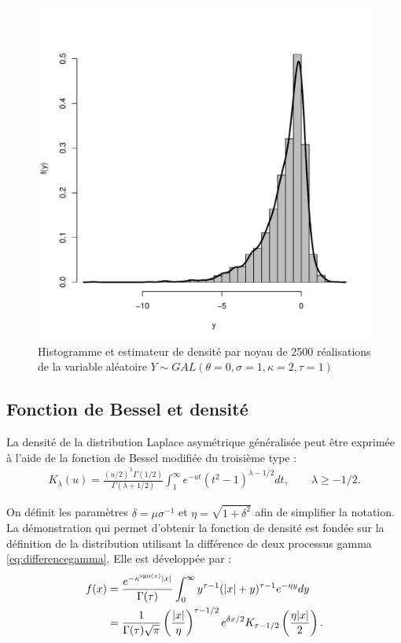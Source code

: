\begin{figure}[!ht]
  \centering
  \includegraphics[scale=0.8]{"../graphiques/CH3-SIMULGAL0121"}
  \caption{Histogramme et estimateur de densité par noyau de 2500
    réalisations de la variable aléatoire $Y\sim
    GAL(\theta=0,\sigma=1,\kappa=2,\tau=1)$}
  \label{fig:simulGAL}
\end{figure}

\subsection{Fonction de Bessel et densité}
\label{sec:besseldensiteGAL}

La densité de la distribution Laplace asymétrique généralisée peut
être exprimée à l'aide de la fonction de Bessel modifiée du troisième
type \citep{abramowitz1965handbook}:
\begin{align}
  \label{eq:BesselK}
  K_{\lambda}(u) =
  \frac{(u/2)^{\lambda}\Gamma(1/2)}{\Gamma(\lambda+1/2)}
  \int_1^{\infty} e^{-ut} (t^2-1)^{\lambda-1/2}dt,\qquad \lambda \geq
  -1/2.
\end{align}

On définit les paramètres $\delta = \mu\sigma^{-1}$ et $\eta =
\sqrt{1+\delta^2}$ afin de simplifier la notation.  La démonstration
qui permet d'obtenir la fonction de densité est fondée sur la
définition de la distribution utilisant la différence de deux
processus gamma \eqref{eq:differencegamma}.  Elle est développée par
\cite{kozubowski1999class}:
\begin{align}
  \label{eq:densitekotz}
  f(x) &= \frac{e^{-\kappa^{\operatorname{sgn}(x)}|x|}}{\Gamma(\tau)} \int_{0}^{\infty} y^{\tau-1}(|x|+y)^{\tau-1}e^{-\eta y} dy \nonumber\\
  &= \frac{1}{\Gamma(\tau)\sqrt{\pi}} \left(\frac{|x|}{\eta}
  \right)^{\tau-1/2} e^{\delta x/2} K_{\tau-1/2}\left(\frac{\eta
      |x|}{2}\right).
\end{align}

